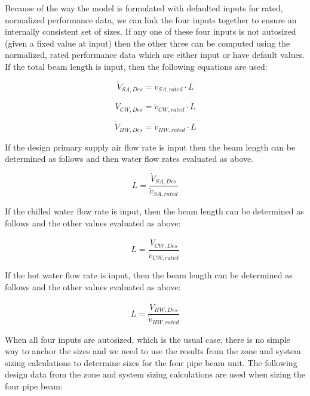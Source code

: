 Because of the way the model is formulated with defaulted inputs for rated, normalized performance data, we can link the four inputs together to ensure an internally consistent set of sizes. If any one of these four inputs is not autosized (given a fixed value at input) then the other three can be computed using the normalized, rated performance data which are either input or have default values. If the total beam length is input, then the following equations are used:

\begin{equation}
  {\dot V_{SA,Des}} = {{\dot v_{SA,rated}} \cdot {L}}
\end{equation}

\begin{equation}
  {\dot V_{CW,Des}} = {{\dot v_{CW,rated}} \cdot {L}}
\end{equation}

\begin{equation}
  {\dot V_{HW,Des}} = {{\dot v_{HW,rated}} \cdot {L}}
\end{equation}

If the design primary supply air flow rate is input then the beam length can be determined as follows and then water flow rates evaluated as above.

\begin{equation}
{L} = {\frac{{\dot V_{SA,Des}}}{{\dot v_{SA,rated}}}  }
\end{equation}

If the chilled water flow rate is input, then the beam length can be determined as follows and the other values evaluated as above:

\begin{equation}
{L} = {\frac{{\dot V_{CW,Des}}}{{\dot v_{CW,rated}}}  }
\end{equation}

If the hot water flow rate is input, then the beam length can be determined as follows and the other values evaluated as above:

\begin{equation}
{L} = {\frac{{\dot V_{HW,Des}}}{{\dot v_{HW,rated}}}  }
\end{equation}

When all four inputs are autosized, which is the usual case, there is no simple way to anchor the sizes and we need to use the results from the zone and system sizing calculations to determine sizes for the four pipe beam unit. The following design data from the zone and system sizing calculations are used when sizing the four pipe beam:


